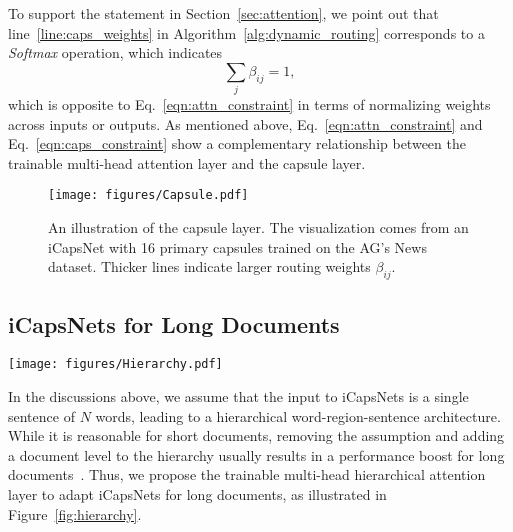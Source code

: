 \documentclass[10pt,journal,compsoc]{IEEEtran}
\begin{document}
To support the statement in Section~\ref{sec:attention}, we point out that line~\ref{line:caps_weights} in Algorithm~\ref{alg:dynamic_routing} corresponds to a \textit{Softmax} operation, which indicates
\begin{equation}\label{eqn:caps_constraint}
	\sum_{j}\beta_{ij} = 1,
\end{equation}
which is opposite to Eq.~\eqref{eqn:attn_constraint} in terms of normalizing weights across inputs or outputs. As mentioned above, Eq.~\eqref{eqn:attn_constraint} and Eq.~\eqref{eqn:caps_constraint} show a complementary relationship between the trainable multi-head attention layer and the capsule layer.

\begin{figure}[t]
	\centering
	\texttt{[image: figures/Capsule.pdf]}
	\caption{An illustration of the capsule layer. The visualization comes from an iCapsNet with 16 primary capsules trained on the AG's News dataset. Thicker lines indicate larger routing weights $\beta_{ij}$.}
	\label{fig:capsule}
\end{figure}

\subsection{iCapsNets for Long Documents}\label{sec:hierarchical_attention}

\begin{figure*}[t]
	\centering
	\texttt{[image: figures/Hierarchy.pdf]}
	\caption{An illustration of the trainable multi-head hierarchical attention layer used in iCapsNets for long documents. Details are provided in Section~\ref{sec:hierarchical_attention}.}
	\label{fig:hierarchy}
\end{figure*}

In the discussions above, we assume that the input to iCapsNets is a single sentence of $N$ words, leading to a hierarchical word-region-sentence architecture. While it is reasonable for short documents, removing the assumption and adding a document level to the hierarchy usually results in a performance boost for long documents~\cite{tang2015document,yang2016hierarchical}. Thus, we propose the trainable multi-head hierarchical attention layer to adapt iCapsNets for long documents, as illustrated in Figure~\ref{fig:hierarchy}.
\end{document}
